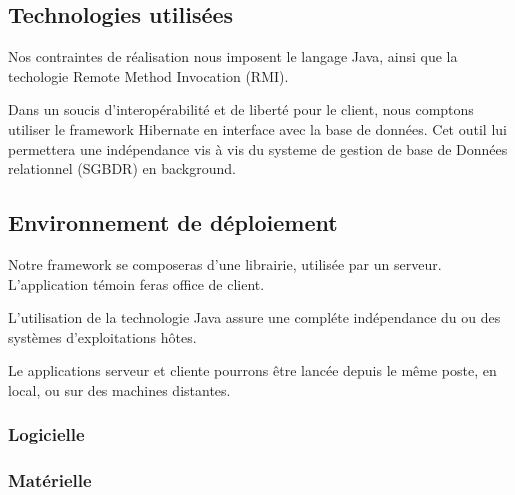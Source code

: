 \documentclass[10pt,a4paper]{article}
\begin{document}
 \subsection{Technologies utilisées}
Nos contraintes de réalisation nous imposent le langage Java, ainsi que la techologie
Remote Method Invocation (RMI).

Dans un soucis d'interopérabilité et de liberté pour le client, nous comptons utiliser le framework Hibernate en interface avec la base de données. Cet outil lui permettera une indépendance vis à vis du systeme de gestion de base de Données relationnel (SGBDR) en background.

%
 \subsection{Environnement de déploiement}

Notre framework se composeras d'une librairie, utilisée par un serveur. L'application témoin feras office de client.

L'utilisation de la technologie Java assure une compléte indépendance du ou des systèmes d'exploitations hôtes.

Le applications serveur et cliente pourrons être lancée depuis le même poste, en local, ou sur des machines distantes.
  \subsubsection{Logicielle}
  \subsubsection{Matérielle}
\end{document}
